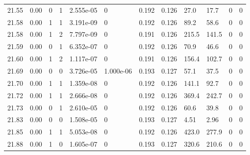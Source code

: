 \documentclass[preview]{standalone}
\begin{document}
{{{{{{{{{{{{{{{{{\begin{tabular}{L{1.2cm}C{1.2cm} C{0.3cm}C{0.5cm} C{1.4cm}C{1.4cm} C{1.4cm}C{1.4cm} C{1.6cm}C{1.6cm} C{1.6cm}C{1.6cm}}
  21.55  &  0.00  & 0     &  1 &  2.555e-05  & 0  &  0.192&   0.126& 27.0 & 17.7   &  0 & 0  \\ 
  21.58  &  0.00  & 1     &  1 &  3.191e-09  & 0  &  0.192&   0.126& 89.2 & 58.6   &  0 & 0  \\ 
  21.58  &  0.00  & 1     &  2 &  7.797e-09  & 0  &  0.191&   0.126& 215.5 & 141.5   &  0 & 0  \\ 
  21.59  &  0.00  & 0     &  1 &  6.352e-07  & 0  &  0.192&   0.126& 70.9 & 46.6   &  0 & 0  \\ 
  21.60  &  0.00  & 1     &  2 &  1.117e-07  & 0  &  0.191&   0.126& 156.4 & 102.7   &  0 & 0  \\ 
  21.69  &  0.00  & 0     &  0 &  3.726e-05  & 1.000e-06  &  0.193&   0.127& 57.1 & 37.5   &  0 & 0  \\ 
  21.70  &  0.00  & 1     &  1 &  1.359e-08  & 0  &  0.192&   0.126& 141.1 & 92.7   &  0 & 0  \\ 
  21.72  &  0.00  & 1     &  1 &  2.666e-08  & 0  &  0.192&   0.126& 369.4 & 242.7   &  0 & 0  \\ 
  21.73  &  0.00  & 0     &  1 &  2.610e-05  & 0  &  0.192&   0.126& 60.6 & 39.8   &  0 & 0  \\ 
  21.83  &  0.00  & 0     &  0 &  1.508e-05  & 0  &  0.193&   0.127& 4.51 & 2.96   &  0 & 0  \\ 
  21.85  &  0.00  & 1     &  1 &  5.053e-08  & 0  &  0.192&   0.126& 423.0 & 277.9   &  0 & 0  \\ 
  21.88  &  0.00  & 1     &  0 &  1.605e-07  & 0  &  0.193&   0.127& 320.6 & 210.6   &  0 & 0  \\ 
\hline 
\end{tabular} 

}}}}}}}}}}}}}}}}}
\end{document}
